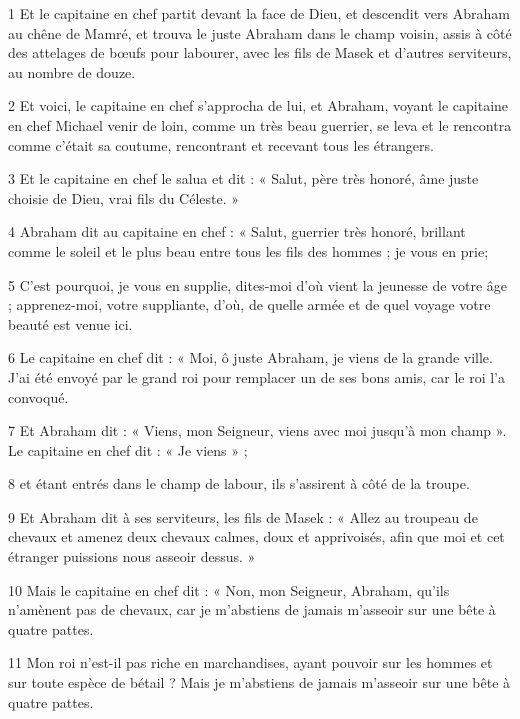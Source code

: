 \par 1 Et le capitaine en chef partit devant la face de Dieu, et descendit vers Abraham au chêne de Mamré, et trouva le juste Abraham dans le champ voisin, assis à côté des attelages de bœufs pour labourer, avec les fils de Masek et d'autres serviteurs, au nombre de douze.

\par 2 Et voici, le capitaine en chef s'approcha de lui, et Abraham, voyant le capitaine en chef Michael venir de loin, comme un très beau guerrier, se leva et le rencontra comme c'était sa coutume, rencontrant et recevant tous les étrangers.

\par 3 Et le capitaine en chef le salua et dit : « Salut, père très honoré, âme juste choisie de Dieu, vrai fils du Céleste. »

\par 4 Abraham dit au capitaine en chef : « Salut, guerrier très honoré, brillant comme le soleil et le plus beau entre tous les fils des hommes ; je vous en prie;

\par 5 C'est pourquoi, je vous en supplie, dites-moi d'où vient la jeunesse de votre âge ; apprenez-moi, votre suppliante, d'où, de quelle armée et de quel voyage votre beauté est venue ici.

\par 6 Le capitaine en chef dit : « Moi, ô juste Abraham, je viens de la grande ville. J'ai été envoyé par le grand roi pour remplacer un de ses bons amis, car le roi l'a convoqué.

\par 7 Et Abraham dit : « Viens, mon Seigneur, viens avec moi jusqu'à mon champ ». Le capitaine en chef dit : « Je viens » ;

\par 8 et étant entrés dans le champ de labour, ils s'assirent à côté de la troupe.

\par 9 Et Abraham dit à ses serviteurs, les fils de Masek : « Allez au troupeau de chevaux et amenez deux chevaux calmes, doux et apprivoisés, afin que moi et cet étranger puissions nous asseoir dessus. »

\par 10 Mais le capitaine en chef dit : « Non, mon Seigneur, Abraham, qu'ils n'amènent pas de chevaux, car je m'abstiens de jamais m'asseoir sur une bête à quatre pattes.

\par 11 Mon roi n'est-il pas riche en marchandises, ayant pouvoir sur les hommes et sur toute espèce de bétail ? Mais je m'abstiens de jamais m'asseoir sur une bête à quatre pattes.

